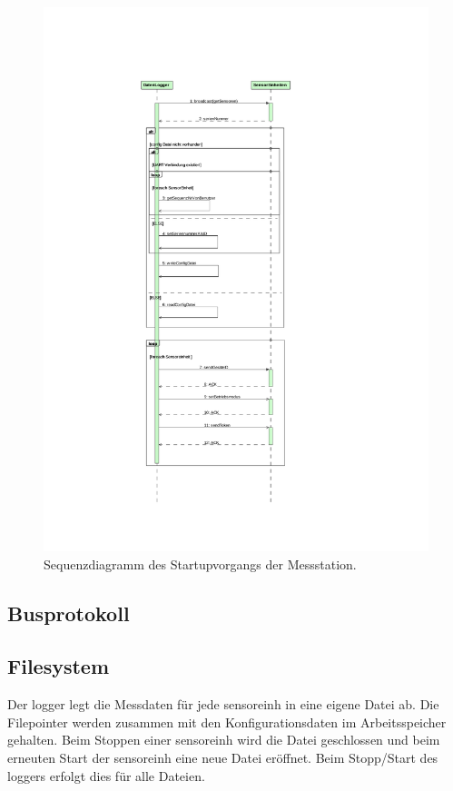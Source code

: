 \begin{figure}
	\centering
		\includegraphics[height=0.9\textheight]{images/magicdraw/StartUpSequenz.pdf}
	\caption{Sequenzdiagramm des Startupvorgangs der Messstation.}
	\label{fig.seq_startup}
\end{figure}


\subsection{Busprotokoll}\label{subsec.sw_busprotokoll}

\subsection{Filesystem}\label{subsec.sw_filesystem}
Der \gls{logger} legt die Messdaten für jede \gls{sensoreinh} in eine eigene Datei ab. Die Filepointer werden zusammen mit den Konfigurationsdaten im Arbeitsspeicher gehalten. Beim Stoppen einer \gls{sensoreinh} wird die Datei geschlossen und beim erneuten Start der \gls{sensoreinh} eine neue Datei eröffnet. Beim Stopp/Start des \gls{logger}s erfolgt dies für alle Dateien.

